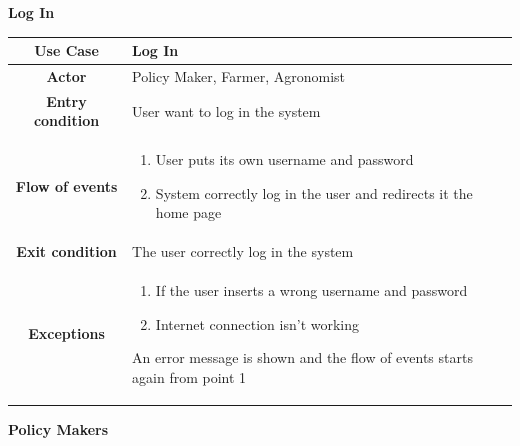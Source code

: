 \documentclass[table, 12pt]{article}
\begin{document}
\begin{itemize}
            \begin{table}[H]
                \item[] \textbf{Log In}
                \item[]  
                \centering
                \begin{tabular}{|c| m{}|}
                    \hline
                    \textbf{Use Case} & Log In\\ \hline
                    \textbf{Actor} & Policy Maker, Farmer, Agronomist\\ \hline
                    \textbf{Entry condition} & User want to log in the system\\  \hline
                    \textbf{Flow of events} & \begin{enumerate}
                                                \item User puts its own username and password
                                                \item System correctly log in the user and redirects it the home page
                                            \end{enumerate}\\ \hline
                    \textbf{Exit condition} & The user correctly log in the system\\ \hline
                    \textbf{Exceptions} &  \begin{enumerate}
                        \item If the user inserts a wrong username and password
                        \item Internet connection isn't working
                    \end{enumerate}
                    An error message is shown and the flow of events starts again from point 1\\ \hline                    
                \end{tabular}
            \end{table}

            \newpage
            \item \textbf{Policy Makers}
            

\end{itemize}
\end{document}
